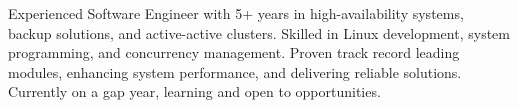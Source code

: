 

\begin{cvparagraph}

Experienced Software Engineer with 5+ years in high-availability systems, backup solutions, and active-active clusters. Skilled in Linux development, system programming, and concurrency management. Proven track record leading modules, enhancing system performance, and delivering reliable solutions.  Currently on a gap year, learning and open to opportunities.
\end{cvparagraph}
